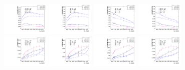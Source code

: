 \begin{figure}[htbp]
  \includegraphics[width=0.2\textwidth]{fig/2Dfit/paramSignalYield_VBFSig_mu_HP_vbf_LDy.pdf}
  \includegraphics[width=0.2\textwidth]{fig/2Dfit/paramSignalYield_VBFSig_e_HP_vbf_LDy.pdf}
  \includegraphics[width=0.2\textwidth]{fig/2Dfit/paramSignalYield_VBFSig_mu_LP_vbf_LDy.pdf}
  \includegraphics[width=0.2\textwidth]{fig/2Dfit/paramSignalYield_VBFSig_e_LP_vbf_LDy.pdf}\\
  \includegraphics[width=0.2\textwidth]{fig/2Dfit/paramSignalYield_VBFSig_mu_HP_bb_HDy.pdf}
  \includegraphics[width=0.2\textwidth]{fig/2Dfit/paramSignalYield_VBFSig_e_HP_bb_HDy.pdf}
  \includegraphics[width=0.2\textwidth]{fig/2Dfit/paramSignalYield_VBFSig_mu_LP_bb_HDy.pdf}
  \includegraphics[width=0.2\textwidth]{fig/2Dfit/paramSignalYield_VBFSig_e_LP_bb_HDy.pdf}\\

\end{figure}
